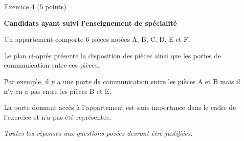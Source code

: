 
%
\begin{h2}Exercice 4 (5 points)\end{h2}
\par
\textbf{Candidats ayant suivi l'enseignement de spécialité}
\par
Un appartement comporte 6 pièces notées A, B, C, D, E et F.
\par
Le plan ci-après présente la disposition des pièces ainsi que les portes de communication entre ces pièces.


\begin{center}
\end{center}
\par
Par exemple, il y a une porte de communication entre les pièces A et B mais il n'y en a pas entre les pièces B et E.
\par
La porte donnant accès à l'appartement est sans importance dans le cadre de l'exercice et n'a pas été représentée.
\par
\textit{Toutes les réponses aux questions posées devront être justifiées.}
\par
